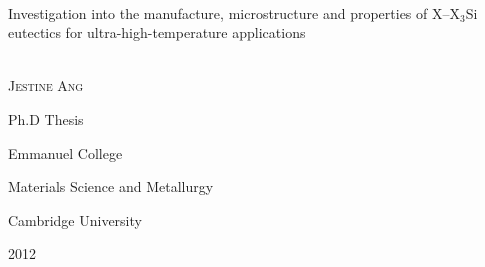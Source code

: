 \begin{titlepage}
\begin{center}

\vspace*{5cm}

\HRule \\[0.5cm]
{ \huge Investigation into the manufacture, microstructure and properties of X--X$_3$Si eutectics for ultra-high-temperature applications}\\[0.3cm]
\HRule \\[1.5cm]
\vspace{5cm}

{
\centering
\large

\textsc{Jestine Ang}

\large
Ph.D Thesis

Emmanuel College

Materials Science and Metallurgy

Cambridge University

2012
}

\begin{minipage}{0.4\textwidth}


\end{minipage}
\vfill
\end{center}
\end{titlepage}